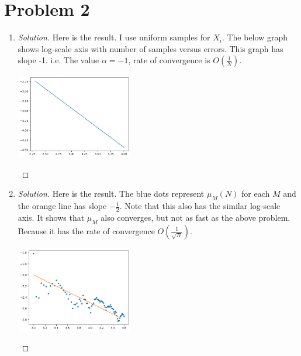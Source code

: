 \section*{Problem 2}
	\begin{enumerate} [1)]
		\item \begin{proof} [Solution]
			Here is the result. I use uniform samples for $X_i$. The below graph shows log-scale axis with number of samples versus errors. This graph has slope -1. i.e. The value $\alpha = -1$, rate of convergence is $O\left(\frac{1}{N}\right)$.
			\begin{center}
				\includegraphics[width=0.4\textwidth]{line_with_-1.png}
			\end{center}
		\end{proof}
		\item \begin{proof} [Solution]
			Here is the result. The blue dots represent $\mu_M(N)$ for each $M$ and the orange line has slope $-\frac{1}{2}$. Note that this also has the similar log-scale axis. It shows that $\mu_M$ also converges, but not as fast as the above problem. Because it has the rate of convergence $O\left(\frac{1}{\sqrt{N}}\right)$.
			\begin{center}
				\includegraphics[width=0.4\textwidth]{line_with_half.png}
			\end{center}
		\end{proof}
	\end{enumerate}